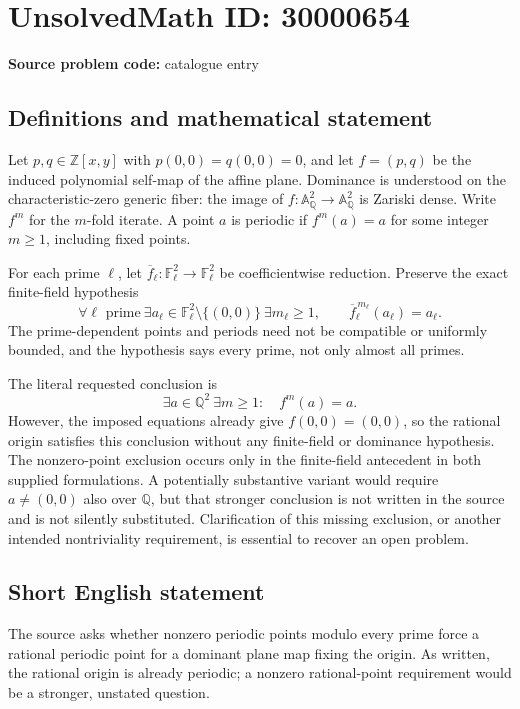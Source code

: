 \documentclass[11pt]{article}
\newcommand{\Z}{\mathbb{Z}}
\newcommand{\Q}{\mathbb{Q}}
\newcommand{\F}{\mathbb{F}}
\begin{document}
\section*{UnsolvedMath ID: 30000654}
\textbf{Source problem code:} catalogue entry
\subsection{Definitions and mathematical statement}
Let $p,q\in\Z[x,y]$ with $p(0,0)=q(0,0)=0$, and let $f=(p,q)$ be the induced polynomial self-map of the affine plane. Dominance is understood on the characteristic-zero generic fiber: the image of $f:\mathbb A^2_{\Q}\to\mathbb A^2_{\Q}$ is Zariski dense. Write $f^m$ for the $m$-fold iterate. A point $a$ is periodic if $f^m(a)=a$ for some integer $m\geq1$, including fixed points.

For each prime $\ell$, let $\overline f_\ell:\F_\ell^2\to\F_\ell^2$ be coefficientwise reduction. Preserve the exact finite-field hypothesis
\[
\forall\ell\text{ prime}\ \exists a_\ell\in\F_\ell^2\setminus\{(0,0)\}\ \exists m_\ell\geq1,
\qquad \overline f_\ell^{\,m_\ell}(a_\ell)=a_\ell.
\]
The prime-dependent points and periods need not be compatible or uniformly bounded, and the hypothesis says every prime, not only almost all primes.

The literal requested conclusion is
\[
\exists a\in\Q^2\ \exists m\geq1:\quad f^m(a)=a.
\]
However, the imposed equations already give $f(0,0)=(0,0)$, so the rational origin satisfies this conclusion without any finite-field or dominance hypothesis. The nonzero-point exclusion occurs only in the finite-field antecedent in both supplied formulations. A potentially substantive variant would require $a\ne(0,0)$ also over $\Q$, but that stronger conclusion is not written in the source and is not silently substituted. Clarification of this missing exclusion, or another intended nontriviality requirement, is essential to recover an open problem.
\subsection{Short English statement}
The source asks whether nonzero periodic points modulo every prime force a rational periodic point for a dominant plane map fixing the origin. As written, the rational origin is already periodic; a nonzero rational-point requirement would be a stronger, unstated question.
\end{document}
